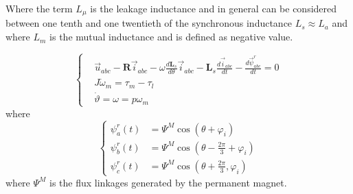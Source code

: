 \documentclass[11pt,a4paper,oneside]{book}
\numberwithin{equation}{section}
\theoremstyle{it}
\theoremstyle{definition}
\begin{document}
Where the term $L_{\mu}$ is the leakage inductance and in general can be 
considered between one tenth and one twentieth of the synchronous inductance 
$L_s \approx L_a$ and where $L_m$ is the mutual inductance and is defined as 
negative value.

\begin{equation}\label{threephase_eq3}
	\left\lbrace \begin{aligned}
		& 
		\vec{u}_{abc}-\mathbf{R}\vec{i}_{abc}-\omega\frac{d\mathbf{L}_s}{d\theta}\vec{i}_{abc}-\mathbf{L}_s\frac{d\vec{i}_{abc}}{dt}-\frac{d\vec{\psi}^r_{abc}}{dt}
		= 0 \\[6pt]
		& J\dot{\omega}_m = \tau_m-\tau_l \\[6pt]
		& \dot{\vartheta} = \omega =p\omega_m
	\end{aligned} \right. 
\end{equation}
where
\begin{equation}\label{magnet_flux}
	\left\lbrace \begin{aligned}
		\psi_a^r(t) &= \Psi^M\cos(\theta+\varphi_i) \\[6pt]
		\psi_b^r(t) &= \Psi^M\cos(\theta-\frac{2\pi}{3}+ \varphi_i) \\[6pt]
		\psi_c^r(t) &= \Psi^M\cos(\theta+\frac{2\pi}{3}, \varphi_i)
	\end{aligned} \right. 
\end{equation}
where $\Psi^M$ is the flux linkages generated by the permanent magnet.    
\end{document}
